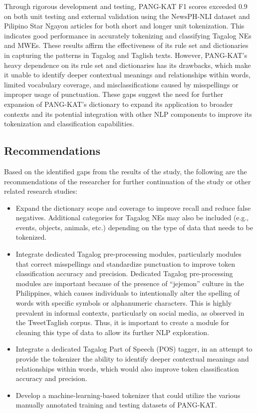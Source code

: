 \documentclass[journal]{./IEEE/IEEEtran}
\begin{document}
Through rigorous development and testing, PANG-KAT F1 scores exceeded 0.9 on both unit testing and external validation using the NewsPH-NLI dataset and Pilipino Star Ngayon articles for both short and longer unit tokenization. This indicates good performance in accurately tokenizing and classifying Tagalog NEs and MWEs. These results affirm the effectiveness of its rule set and dictionaries in capturing the patterns in Tagalog and Taglish texts. However, PANG-KAT’s heavy dependence on its rule set and dictionaries has its drawbacks, which make it unable to identify deeper contextual meanings and relationships within words, limited vocabulary coverage, and misclassifications caused by misspellings or improper usage of punctuation. These gaps suggest the need for further expansion of PANG-KAT’s dictionary to expand its application to broader contexts and its potential integration with other NLP components to improve its tokenization and classification capabilities. \\

\subsection {Recommendations}

Based on the identified gaps from the results of the study, the following are the recommendations of the researcher for further continuation of the study or other related research studies: \\

\begin{itemize}
  \item Expand the dictionary scope and coverage to improve recall and reduce false negatives. Additional categories for Tagalog NEs may also be included (e.g., events, objects, animals, etc.) depending on the type of data that needs to be tokenized.
  \item Integrate dedicated Tagalog pre-processing modules, particularly modules that correct misspellings and standardize punctuation to improve token classification accuracy and precision. Dedicated Tagalog pre-processing modules are important because of the presence of “jejemon” culture in the Philippines, which causes individuals to intentionally alter the spelling of words with specific symbols or alphanumeric characters. This is highly prevalent in informal contexts, particularly on social media, as observed in the TweetTaglish corpus. Thus, it is important to create a module for cleaning this type of data to allow its further NLP exploration.
  \item Integrate a dedicated Tagalog Part of Speech (POS) tagger, in an attempt to provide the tokenizer the ability to identify deeper contextual meanings and relationships within words, which would also improve token classification accuracy and precision.
  \item Develop a machine-learning-based tokenizer that could utilize the various manually annotated training and testing datasets of PANG-KAT.

\end{itemize}
\end{document}
